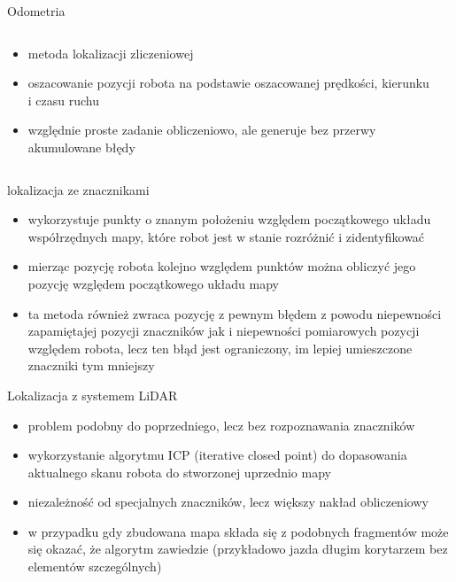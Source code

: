 \begin{frame}
{Odometria}
	\begin{columns}
		\begin{column}{0.5\textwidth}
			\begin{itemize}
				\item metoda lokalizacji zliczeniowej
				\item oszacowanie pozycji robota na podstawie oszacowanej prędkości, kierunku i czasu ruchu
				\item względnie proste zadanie obliczeniowo, ale generuje bez przerwy akumulowane błędy
			\end{itemize}
		\end{column}
		\begin{column}{0.5\textwidth}  %
		\end{column}
	\end{columns}
\end{frame}

\begin{frame}
{lokalizacja ze znacznikami}
	\begin{itemize}
		\item wykorzystuje punkty o znanym położeniu względem początkowego układu współrzędnych mapy, które robot jest w stanie rozróżnić i zidentyfikować
		\item mierząc pozycję robota kolejno względem punktów można obliczyć jego pozycję względem początkowego układu mapy
		\item ta metoda również zwraca pozycję z pewnym błędem z powodu niepewności zapamiętajej pozycji znaczników jak i niepewności pomiarowych pozycji względem robota, lecz ten błąd jest ograniczony, im lepiej umieszczone znaczniki tym mniejszy
	\end{itemize}
\end{frame}

\begin{frame}
{Lokalizacja z systemem LiDAR}
	\begin{itemize}
		\item problem podobny do poprzedniego, lecz bez rozpoznawania znaczników
		\item wykorzystanie algorytmu ICP (iterative closed point) do dopasowania aktualnego skanu robota do stworzonej uprzednio mapy
		\item niezależność od specjalnych znaczników, lecz większy nakład obliczeniowy
		\item w przypadku gdy zbudowana mapa składa się z podobnych fragmentów może się okazać, że algorytm zawiedzie (przykładowo jazda długim korytarzem bez elementów szczególnych)
	\end{itemize}
\end{frame}

